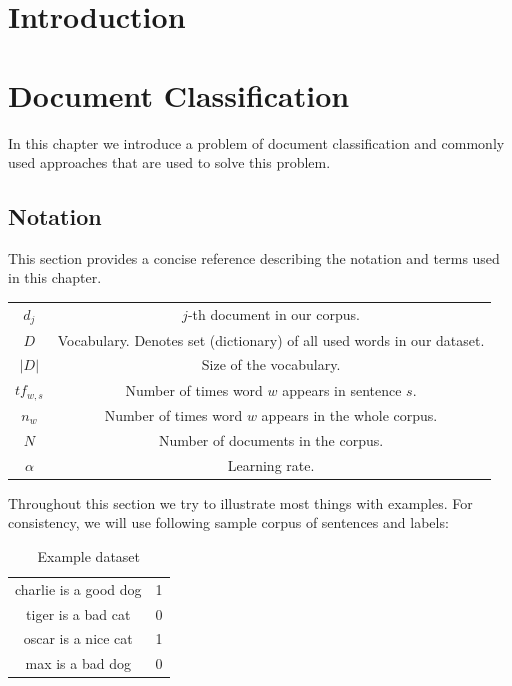\chapter*{Introduction}


\chapter{Document Classification}
    In this chapter we introduce a problem of document classification and commonly used approaches that are used to solve this problem.
    \* %
    
    \section{Notation}
        This section provides a concise reference describing the notation and terms used in this chapter.
        
        \begin{table}[h]
            \centering
            \begin{tabular}{c c}
                $d_j$ & $j$-th document in our corpus.\\
                $D$ & Vocabulary. Denotes set (dictionary) of all used words in our dataset. \\
                $|D|$ & Size of the vocabulary. \\
                $tf_{w,s}$ & Number of times word $w$ appears in sentence $s$. \\
                $n_w$ & Number of times word $w$ appears in the whole corpus. \\
                $N$ & Number of documents in the corpus. \\
                $\alpha$ & Learning rate.
            \end{tabular}
        \end{table}
        
        Throughout this section we try to illustrate most things with examples. 
        For consistency, we will use following sample corpus of sentences and labels:
        
        \begin{table}[h]
            \centering
            \begin{tabular}{c|c}
            \hline
                charlie is a good dog & 1 \\
                tiger is a bad cat & 0 \\
                oscar is a nice cat & 1 \\
                max is a bad dog & 0 \\
            \end{tabular}
            \caption{Example dataset}
            \label{tab:example:dataset}

        \end{table}
        

